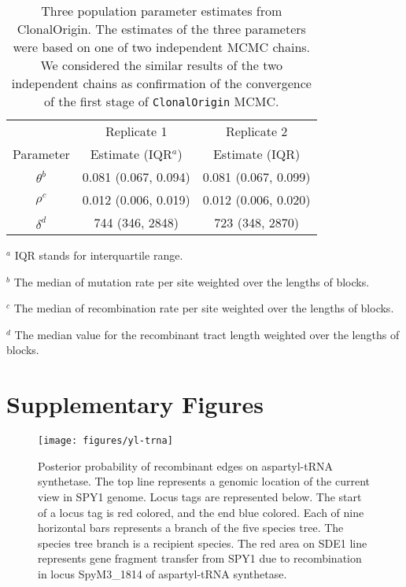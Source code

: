 \documentclass[english]{article}
\providecommand{\tabularnewline}{\\}
\begin{document}
\begin{table}
\caption{\label{tab:three}Three population parameter estimates from
ClonalOrigin. 
The estimates of the three parameters were based on one of two independent
MCMC chains.  We considered the similar 
results of the two independent chains as confirmation of 
the convergence of the first stage of \texttt{ClonalOrigin} MCMC.
}
\noindent \centering{}\begin{tabular}{ccc}
& Replicate 1 & Replicate 2\tabularnewline
Parameter & Estimate (IQR$^a$) & Estimate (IQR)\tabularnewline
\hline
$\theta^b$ & 0.081 (0.067, 0.094) & 0.081 (0.067, 0.099)\tabularnewline
$\rho^c$ & 0.012 (0.006, 0.019) & 0.012 (0.006, 0.020)\tabularnewline
$\delta^d$ & 744 (346, 2848) & 723 (348, 2870)\tabularnewline
\end{tabular}

$^a$ IQR stands for interquartile range.

$^b$ The median of mutation rate per site weighted over the lengths of blocks. 

$^c$ The median of recombination rate per site weighted over the lengths of blocks.

$^d$ The median value for the recombinant tract length weighted over the lengths of blocks.

\end{table}
\clearpage{}


\section*{Supplementary Figures}

\clearpage{}

\begin{figure}
\texttt{[image: figures/yl-trna]}
\caption{\label{fig:muts}Posterior probability of recombinant edges on 
aspartyl-tRNA
synthetase.  The
top line represents a genomic location of the current view in SPY1 genome. Locus
tags are represented below. The start of a locus tag is red colored, and the end
blue colored. Each of nine horizontal bars represents a branch of the five
species tree. The species tree branch is a recipient species.
The red area on SDE1 line represents gene fragment transfer from
SPY1 due to recombination in locus SpyM3\_1814 of aspartyl-tRNA synthetase.}
\end{figure}
\clearpage{}%
\end{document}
